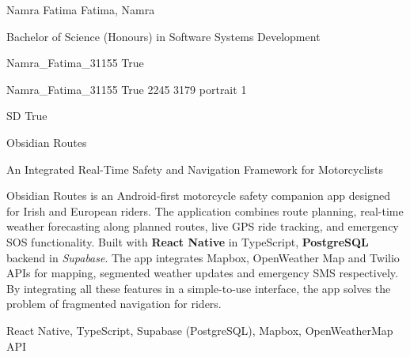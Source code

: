 
\begingroup{}\relax



\def\Key{Namra_Fatima_31155}

{Namra Fatima}
{Fatima, Namra}

{Bachelor of Science (Honours) in Software Systems Development}

{Namra_Fatima_31155}
{True}

{Namra_Fatima_31155}
{True}
{2245}
{3179}
{portrait}
{1}

{SD}
{True}

{Obsidian Routes}

{An Integrated Real-Time Safety and Navigation Framework for Motorcyclists}

{Obsidian Routes is an Android-first motorcycle safety companion app designed for Irish and European riders. The application combines route planning, real-time weather forecasting along planned routes, live GPS ride tracking, and emergency SOS functionality. Built with {\bfseries React Native} in TypeScript, {\bfseries PostgreSQL} backend in {\em Supabase}. The app integrates Mapbox, OpenWeather Map and Twilio APIs for mapping, segmented weather updates and emergency SMS respectively. By integrating all these features in a simple-to-use interface, the app solves the problem of fragmented navigation for riders.}

{React Native, TypeScript, Supabase (PostgreSQL), Mapbox, OpenWeatherMap API}

